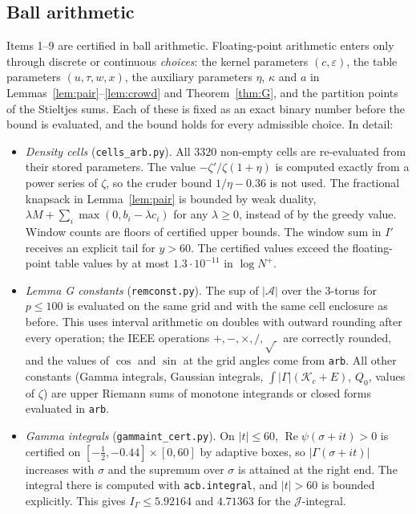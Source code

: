 \documentclass[11pt]{amsart}
\numberwithin{equation}{section}
\theoremstyle{definition}
\theoremstyle{remark}
\newcommand{\Rp}{\operatorname{Re}}
\newcommand{\eps}{\varepsilon}
\newcommand{\code}[1]{\texttt{#1}}
\begin{document}
\subsection{Ball arithmetic}\label{sec:ball}
Items 1--9 are certified in ball arithmetic.
Floating-point arithmetic enters only through discrete or continuous \emph{choices}: the kernel parameters $(c,\eps)$, the table parameters $(u,\tau,w,x)$, the auxiliary parameters $\eta$, $\kappa$ and $a$ in Lemmas~\ref{lem:pair}--\ref{lem:crowd} and Theorem~\ref{thm:G}, and the partition points of the Stieltjes sums.
Each of these is fixed as an exact binary number before the bound is evaluated, and the bound holds for every admissible choice.
In detail:
\begin{itemize}
\item \emph{Density cells} (\code{cells\_arb.py}). All $3320$ non-empty cells are re-evaluated from their stored parameters.
  The value $-\zeta'/\zeta(1+\eta)$ is computed exactly from a power series of $\zeta$, so the cruder bound $1/\eta - 0.36$ is not used.
  The fractional knapsack in Lemma~\ref{lem:pair} is bounded by weak duality, $\lambda M + \sum_i\max(0, b_i - \lambda c_i)$ for any $\lambda\ge0$, instead of by the greedy value.
  Window counts are floors of certified upper bounds.
  The window sum in $I'$ receives an explicit tail for $y > 60$.
  The certified values exceed the floating-point table values by at most $1.3\cdot10^{-11}$ in $\log N^+$.
\item \emph{Lemma G constants} (\code{remconst.py}). The sup of $|\mathcal A|$ over the $3$-torus for $p \le 100$ is evaluated on the same grid and with the same cell enclosure as before.
  This uses interval arithmetic on doubles with outward rounding after every operation; the IEEE operations $+,-,\times,/,\sqrt{\ }$ are correctly rounded, and the values of $\cos$ and $\sin$ at the grid angles come from \code{arb}.
  All other constants (Gamma integrals, Gaussian integrals, $\int|\Gamma|(\mathcal K_c + E)$, $Q_0$, values of $\zeta$) are upper Riemann sums of monotone integrands or closed forms evaluated in \code{arb}.
\item \emph{Gamma integrals} (\code{gammaint\_cert.py}). On $|t| \le 60$, $\Rp\psi(\sigma+it) > 0$ is certified on $[-\frac12,-0.44]\times[0,60]$ by adaptive boxes, so $|\Gamma(\sigma+it)|$ increases with $\sigma$ and the supremum over $\sigma$ is attained at the right end.
  The integral there is computed with \code{acb.integral}, and $|t| > 60$ is bounded explicitly.
  This gives $I_\Gamma \le 5.92164$ and $4.71363$ for the $\mathcal J$-integral.

\end{itemize}
\end{document}
